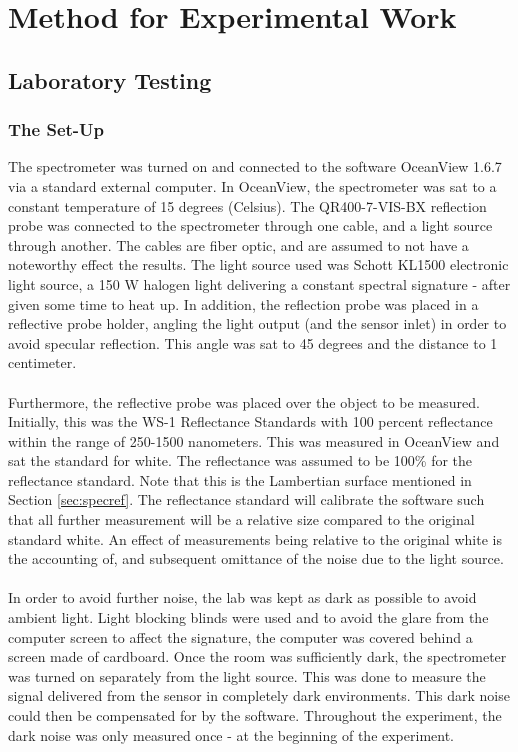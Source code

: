 \chapter{Method for Experimental Work}
\label{chap:method}

\section{Laboratory Testing}

\subsection{The Set-Up}
The spectrometer was turned on and connected to the software OceanView 1.6.7 via a standard external computer. In OceanView, the spectrometer was sat to a constant temperature of 15 degrees (Celsius). The QR400-7-VIS-BX reflection probe was connected to the spectrometer through one cable, and a light source through another. The cables are fiber optic, and are assumed to not have a noteworthy effect the results. The light source used was Schott KL1500 electronic light source, a 150 W halogen light delivering a constant spectral signature - after given some time to heat up. In addition, the reflection probe was placed in a reflective probe holder, angling the light output (and the sensor inlet) in order to avoid specular reflection. This angle was sat to 45 degrees and the distance to 1 centimeter.
\\\\
Furthermore, the reflective probe was placed over the object to be measured. Initially, this was the WS-1 Reflectance Standards with 100 percent reflectance within the range of 250-1500 nanometers. This was measured in OceanView and sat the standard for white. The reflectance was assumed to be 100\% for the reflectance standard. Note that this is the Lambertian surface mentioned in Section \ref{sec:specref}. The reflectance standard will calibrate the software such that all further measurement will be a relative size compared to the original standard white. An effect of measurements being relative to the original white is the accounting of, and subsequent omittance of the noise due to the light source. 
\\\\
In order to avoid further noise, the lab was kept as dark as possible to avoid ambient light. Light blocking blinds were used and to avoid the glare from the computer screen to affect the signature, the computer was covered behind a screen made of cardboard. Once the room was sufficiently dark, the spectrometer was turned on separately from the light source. This was done to measure the signal delivered from the sensor in completely dark environments. This dark noise could then be compensated for by the software. Throughout the experiment, the dark noise was only measured once - at the beginning of the experiment.
